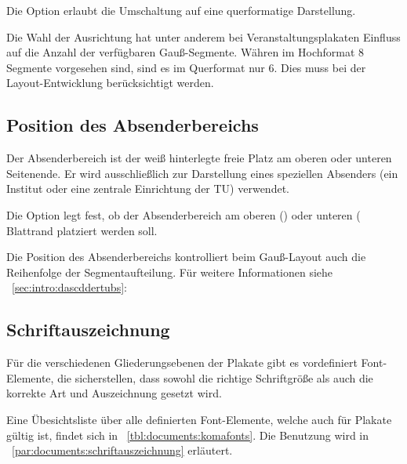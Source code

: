 \begin{Declaration}
\end{Declaration}

Die Option  erlaubt die Umschaltung auf eine
querformatige Darstellung.

\begin{hint}
Die Wahl der Ausrichtung hat unter anderem bei Veranstaltungsplakaten
Einfluss auf die Anzahl der verfügbaren Gauß-Segmente.
Währen im Hochformat 8 Segmente vorgesehen sind, sind es im Querformat nur
6. Dies muss bei der Layout-Entwicklung berücksichtigt werden.
\end{hint}

\subsection*{Position des Absenderbereichs}

Der Absenderbereich ist der weiß hinterlegte freie Platz am oberen oder
unteren Seitenende.
Er wird ausschließlich zur Darstellung eines speziellen Absenders
(ein Institut oder eine zentrale Einrichtung der TU) verwendet.

\begin{Declaration}
\end{Declaration}

Die Option  legt fest, ob der Absenderbereich am oberen ()
oder unteren ( Blattrand platziert werden soll.

Die Position des Absenderbereichs kontrolliert beim Gauß-Layout auch die
Reihenfolge der Segmentaufteilung.
Für weitere Informationen siehe \chaptername~\ref{sec:intro:dascddertubs}:

\subsection*{Schriftauszeichnung}

Für die verschiedenen Gliederungsebenen der Plakate gibt es vordefiniert
Font-Elemente, die sicherstellen, dass sowohl die richtige Schriftgröße
als auch die korrekte Art und Auszeichnung gesetzt wird.

Eine Übesichtsliste über alle definierten Font-Elemente, welche auch
für Plakate gültig ist, findet sich in \tablename~\ref{tbl:documents:komafonts}.
Die Benutzung wird in \chaptername~\ref{par:documents:schriftauszeichnung} erläutert.

